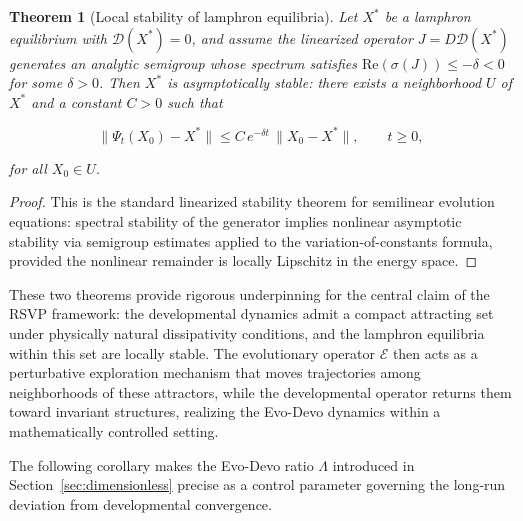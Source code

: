 \documentclass[12pt]{article}
\newtheorem{theorem}{Theorem}[section]
\begin{document}
\begin{theorem}[Local stability of lamphron equilibria]
\label{thm:lamphron_stability}
Let $X^*$ be a lamphron equilibrium with $\mathcal{D}(X^*) = 0$, and assume the linearized operator $J = D\mathcal{D}(X^*)$ generates an analytic semigroup whose spectrum satisfies $\mathrm{Re}(\sigma(J)) \leq -\delta < 0$ for some $\delta > 0$. Then $X^*$ is asymptotically stable: there exists a neighborhood $U$ of $X^*$ and a constant $C > 0$ such that

\begin{equation}
\|\Psi_t(X_0) - X^*\| \leq C\,e^{-\delta t}\,\|X_0 - X^*\|, \qquad t \geq 0,
\end{equation}

for all $X_0 \in U$.
\end{theorem}

\begin{proof}
This is the standard linearized stability theorem for semilinear evolution equations: spectral stability of the generator implies nonlinear asymptotic stability via semigroup estimates applied to the variation-of-constants formula, provided the nonlinear remainder is locally Lipschitz in the energy space.
\end{proof}

These two theorems provide rigorous underpinning for the central claim of the RSVP framework: the developmental dynamics admit a compact attracting set under physically natural dissipativity conditions, and the lamphron equilibria within this set are locally stable. The evolutionary operator $\mathcal{E}$ then acts as a perturbative exploration mechanism that moves trajectories among neighborhoods of these attractors, while the developmental operator returns them toward invariant structures, realizing the Evo-Devo dynamics within a mathematically controlled setting.

The following corollary makes the Evo-Devo ratio $\Lambda$ introduced in Section~\ref{sec:dimensionless} precise as a control parameter governing the long-run deviation from developmental convergence.
\end{document}

